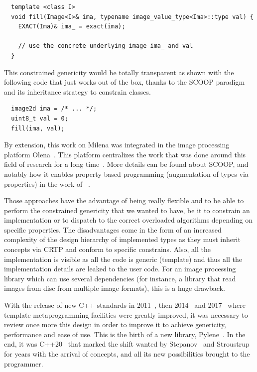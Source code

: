 \begin{verbatim}
  template <class I>
  void fill(Image<I>& ima, typename image_value_type<Ima>::type val) {
    EXACT(Ima)& ima_ = exact(ima);

    // use the concrete underlying image ima_ and val
  }
\end{verbatim}

This constrained genericity would be totally transparent as shown with the following code that just works out of the
box, thanks to the SCOOP paradigm and its inheritance strategy to constrain classes.
\begin{verbatim}
  image2d ima = /* ... */;
  uint8_t val = 0;
  fill(ima, val);
\end{verbatim}

By extension, this work on Milena was integrated in the image processing platform
Olena~\parencite{olena.2000.www,geraud.2012.hdr}. This platform centralizes the work that was done around this field of
research for a long time~\parencite{geraud.2000.icpr,duretlutz.2000.olena,darbon.2002.ismm,darbon.2004.ecoopphd}. More
details can be found about SCOOP, and notably how it enables property based programming (augmentation of types via
properties) in the work of
\citeauthor{levillain.2011.phd}~\parencite{levillain.2011.phd,levillain.2009.ismm,levillain.2010.icip,levillain.2010.wadgmm,levillain.2011.gretsi,levillain.2011.phd,levillain.2012.wadgmm-lncs,levillain.2014.ciarp}.

Those approaches have the advantage of being really flexible and to be able to perform the constrained genericity that
we wanted to have, be it to constrain an implementation or to dispatch to the correct overloaded algorithms depending on
specific properties. The disadvantages come in the form of an increased complexity of the design hierarchy of
implemented types as they must inherit concepts via CRTP and conform to specific constrains. Also, all the
implementation is visible as all the code is generic (template) and thus all the implementation details are leaked to
the user code. For an image processing library which can use several dependencies (for instance, a library that read
images from disc from multiple image formats), this is a huge drawback.

With the release of new C++ standards in 2011~\parencite{iso.2011.cpp}, then 2014~\parencite{iso.2014.cpp} and
2017~\parencite{iso.2017.cpp} where template metaprogramming facilities were greatly improved, it was necessary to
review once more this design in order to improve it to achieve genericity, performance and ease of use. This is the
birth of a new library, Pylene~\parencite{carlinet.2018.pylene}. In the end, it was C++20~\parencite{iso.2011.cpp} that
marked the shift wanted by
Stepanov~\parencite{musser.1988.generic,musser.1994.algorithm,dehnert.1998.fundamentals,stepanov.2009.elements} and
Stroustrup~\parencite{stroustrup.1995.design,stroustrup.1999.hot,stroustrup.2003.concepts,stroustrup.2007.hopl} for
years with the arrival of concepts, and all its new possibilities brought to the programmer.

